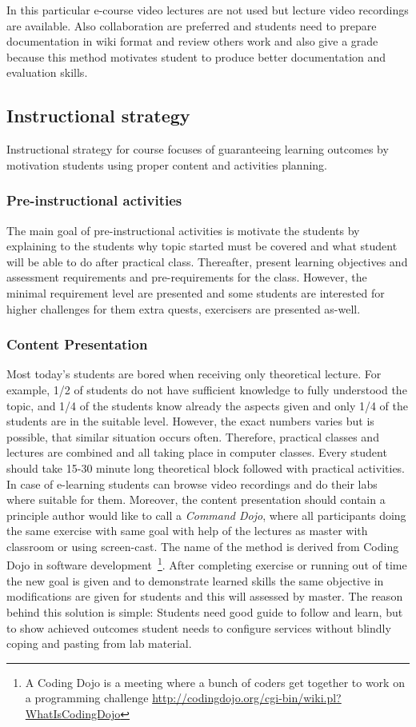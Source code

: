 In this particular e-course video lectures are not used but lecture video recordings are available. Also collaboration are preferred and students need to prepare documentation in wiki format and review others work and also give a grade because this method motivates student to produce better documentation and evaluation skills.




\subsection{Instructional strategy}
Instructional strategy for course focuses of guaranteeing learning outcomes by motivation students using proper content and activities planning.


\subsubsection{Pre-instructional activities}
The main goal of pre-instructional activities is motivate the students by explaining to the students why topic started must be covered and what student will be able to do after practical class. Thereafter, present learning objectives and assessment requirements and pre-requirements for the class. However, the minimal requirement level are presented and some students are interested for higher challenges for them extra quests, exercisers are presented as-well.


\subsubsection{Content Presentation}
Most today’s students are bored when receiving only theoretical lecture. For example, 1/2 of students do not have sufficient knowledge to fully understood the topic, and 1/4 of the students know already the aspects given and only 1/4 of the students are in the suitable level.  However, the exact numbers varies but is possible, that similar situation occurs often. Therefore, practical classes and lectures are combined and all taking place in computer classes. Every student should take 15-30 minute long theoretical block followed with practical activities. In case of e-learning students can browse video recordings and do their labs where suitable for them. Moreover, the content presentation should contain a principle author would like to call a \emph{Command Dojo}, where all participants doing the same exercise with same goal with help of the lectures as master with classroom or using screen-cast. The name of the method is derived from \gls{Coding Dojo} in software development~\footnote{A Coding Dojo is a meeting where a bunch of coders get together to work on a programming challenge \url{http://codingdojo.org/cgi-bin/wiki.pl?WhatIsCodingDojo}}.
After completing exercise or running out of time the new goal is given and to demonstrate learned skills the same objective in modifications are given for students and this will assessed by master. The reason behind this solution is simple: Students need good guide to follow and learn, but to show achieved outcomes student needs to configure services without blindly coping and pasting from lab material.

